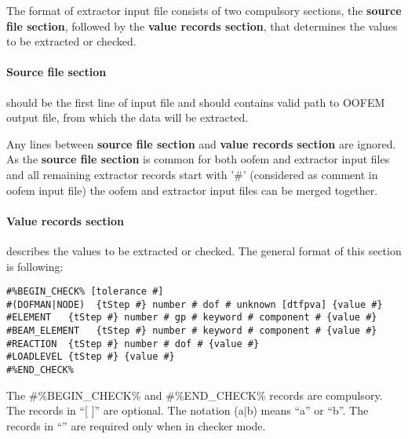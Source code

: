 \documentclass[a4paper]{article}
\newcommand{\excommand}[1]{#1}
\begin{document}
The format
of extractor input file consists of two compulsory sections, the {\bf source file
section}, followed by the {\bf value records section}, that determines the values to be extracted or checked.

\paragraph{Source file section} should be the first line of input file and
should contains valid path to OOFEM output file, from which
the data will be extracted.

Any lines between {\bf source file
section} and {\bf value records section} are
ignored. As the {\bf source file
section} is common for both oofem and extractor input files and all remaining extractor records start with '\#' (considered as comment in oofem input file) the oofem and extractor  input files can be merged together.


\paragraph{Value records section} describes the values to be extracted or checked. The general format of this section is following:
\begin{verbatim}
#%BEGIN_CHECK% [tolerance #]
#(DOFMAN|NODE)  {tStep #} number # dof # unknown [dtfpva] {value #}
#ELEMENT   {tStep #} number # gp # keyword # component # {value #}
#BEAM_ELEMENT   {tStep #} number # keyword # component # {value #}
#REACTION  {tStep #} number # dof # {value #}
#LOADLEVEL {tStep #} {value #}
#%END_CHECK%
\end{verbatim}
The \#\%\excommand{BEGIN\_CHECK}\% and \#\%\excommand{END\_CHECK}\% records are compulsory.
The records in ``[ ]'' are optional. The notation (a$|$b) means ``a'' or ``b''.
The records in ``{}'' are required only when in checker mode.
\end{document}
